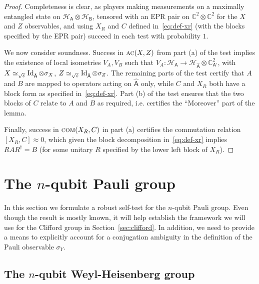 \documentclass[11pt]{article}
\theoremstyle{remark}
\theoremstyle{definition}
\newcommand{\Id}{\ensuremath{\mathop{\rm Id}\nolimits}}
\newcommand{\reg}[1]{{\textsf{#1}}}
\newcommand{\C}{\ensuremath{\mathbb{C}}}
\newcommand{\mH}{\mathcal{H}}
\newcommand{\eps}{\varepsilon}
\newcommand{\comt}{\textsc{com}}
\newcommand{\act}{\textsc{ac}}
\begin{document}
\begin{proof}
Completeness is clear, as players making measurements on a maximally entangled state on $\mH_{\reg{A}}\otimes \mH_{\reg{B}}$, tensored with an EPR pair on $\C^2 \otimes \C^2$ for the $X$ and $Z$ observables, and using $X_R$ and $C$ defined in~\eqref{eq:def-xr} (with the blocks specified by the EPR pair) succeed in each test with probability $1$. 

We now consider soundness. Success in $\act(X,Z)$ from part (a) of the test implies the existence of local isometries $V_A,V_B$ such that $V_A:\mH_\reg{A}\to \mH_{\hat{\reg{A}}}\otimes \C^2_{\reg{A'}}$, with $X\simeq_{\sqrt{\eps}} \Id_{\hat{\reg{A}}}\otimes \sigma_X$, $Z\simeq_{\sqrt{\eps}} \Id_{\hat{\reg{A}}}\otimes\sigma_Z$. The remaining parts of the test certify that $A$ and $B$ are mapped to operators acting on $\hat{\reg{A}}$ only, while $C$ and $X_R$ both have a block form as specified in~\eqref{eq:def-xr}. Part (b) of the test ensures that the two blocks of $C$ relate to $A$ and $B$ as required, i.e. certifies the ``Moreover'' part of the lemma. 

Finally, success in $\comt(X_R,C)$ in part (a) certifies the commutation relation $[X_R,C]\approx 0$, which given the block decomposition in~\eqref{eq:def-xr} implies $RAR^\dagger = B$ (for some unitary $R$ specified by the lower left block of $X_R$). 
\end{proof}



\section{The $n$-qubit Pauli group}
\label{sec:pauli-group}

In this section we formulate a robust self-test for the $n$-qubit Pauli group. Even though the result is mostly known, it will help establish the framework we will use for the Clifford group in Section~\ref{sec:clifford}. In addition, we need to provide a means to explicitly account for a conjugation ambiguity in the definition of the Pauli observable $\sigma_Y$. 

\subsection{The $n$-qubit Weyl-Heisenberg group}
\label{sec:pbt}
\end{document}
